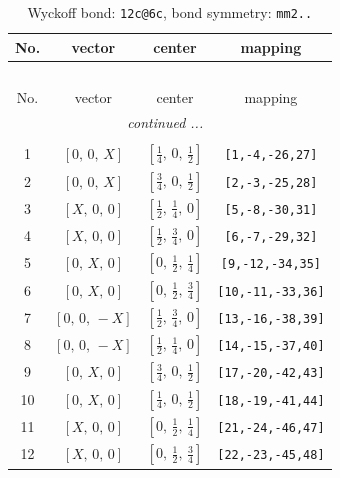\documentclass[fleqn,8pt]{jsarticle}
\begin{document}
\renewcommand{\arraystretch}{1.2}
\begin{longtable}{cccc}
\caption{Wyckoff bond: {\tt 12c@6c}, bond symmetry: {\tt mm2..}}
 \\
 \hline \hline
No. & vector & center & mapping \\ \hline \endfirsthead

\multicolumn{3}{l}{\tablename\ \thetable{}} \\
 \hline \hline
No. & vector & center & mapping \\ \hline \endhead

 \hline \hline
\multicolumn{3}{r}{\footnotesize\it continued ...} \\ \endfoot

 \hline \hline
\multicolumn{3}{r}{} \\ \endlastfoot

1 & $\left[ 0,\, 0,\, X \right]$ & $\left[ \frac{1}{4},\, 0,\, \frac{1}{2} \right]$ & {\tt [1,-4,-26,27]} \\ \hline
2 & $\left[ 0,\, 0,\, X \right]$ & $\left[ \frac{3}{4},\, 0,\, \frac{1}{2} \right]$ & {\tt [2,-3,-25,28]} \\ \hline
3 & $\left[ X,\, 0,\, 0 \right]$ & $\left[ \frac{1}{2},\, \frac{1}{4},\, 0 \right]$ & {\tt [5,-8,-30,31]} \\ \hline
4 & $\left[ X,\, 0,\, 0 \right]$ & $\left[ \frac{1}{2},\, \frac{3}{4},\, 0 \right]$ & {\tt [6,-7,-29,32]} \\ \hline
5 & $\left[ 0,\, X,\, 0 \right]$ & $\left[ 0,\, \frac{1}{2},\, \frac{1}{4} \right]$ & {\tt [9,-12,-34,35]} \\ \hline
6 & $\left[ 0,\, X,\, 0 \right]$ & $\left[ 0,\, \frac{1}{2},\, \frac{3}{4} \right]$ & {\tt [10,-11,-33,36]} \\ \hline
7 & $\left[ 0,\, 0,\, - X \right]$ & $\left[ \frac{1}{2},\, \frac{3}{4},\, 0 \right]$ & {\tt [13,-16,-38,39]} \\ \hline
8 & $\left[ 0,\, 0,\, - X \right]$ & $\left[ \frac{1}{2},\, \frac{1}{4},\, 0 \right]$ & {\tt [14,-15,-37,40]} \\ \hline
9 & $\left[ 0,\, X,\, 0 \right]$ & $\left[ \frac{3}{4},\, 0,\, \frac{1}{2} \right]$ & {\tt [17,-20,-42,43]} \\ \hline
10 & $\left[ 0,\, X,\, 0 \right]$ & $\left[ \frac{1}{4},\, 0,\, \frac{1}{2} \right]$ & {\tt [18,-19,-41,44]} \\ \hline
11 & $\left[ X,\, 0,\, 0 \right]$ & $\left[ 0,\, \frac{1}{2},\, \frac{1}{4} \right]$ & {\tt [21,-24,-46,47]} \\ \hline
12 & $\left[ X,\, 0,\, 0 \right]$ & $\left[ 0,\, \frac{1}{2},\, \frac{3}{4} \right]$ & {\tt [22,-23,-45,48]} \\
\end{longtable}
\end{document}
